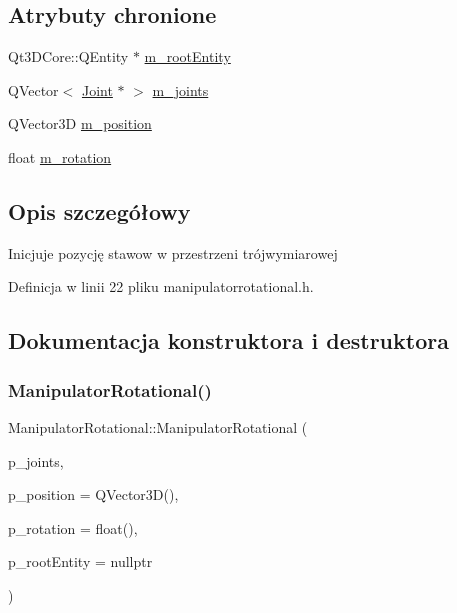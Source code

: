 \subsection*{Atrybuty chronione}
\begin{DoxyCompactItemize}
\item 
Qt3\+D\+Core\+::\+Q\+Entity $\ast$ \hyperlink{class_manipulator_rotational_a826543721395f9b5b7faa57caebe9a08}{m\+\_\+root\+Entity}
\item 
Q\+Vector$<$ \hyperlink{class_joint}{Joint} $\ast$ $>$ \hyperlink{class_manipulator_rotational_a31303c0a6c8a03f3cd0754aec802a808}{m\+\_\+joints}
\item 
Q\+Vector3D \hyperlink{class_manipulator_rotational_a18221f06199833851af9eebd9a6ca438}{m\+\_\+position}
\item 
float \hyperlink{class_manipulator_rotational_a6edaea6ee8740b4a517f49f65ddf229d}{m\+\_\+rotation}
\end{DoxyCompactItemize}


\subsection{Opis szczegółowy}
Inicjuje pozycję stawow w przestrzeni trójwymiarowej 

Definicja w linii 22 pliku manipulatorrotational.\+h.



\subsection{Dokumentacja konstruktora i destruktora}
\mbox{\label{class_manipulator_rotational_adb9a71718449baa93992784d56cf86d7}} 
\subsubsection{\texorpdfstring{Manipulator\+Rotational()}{ManipulatorRotational()}\hspace{0.1cm}{\footnotesize\ttfamily [1/2]}}
{\footnotesize\ttfamily Manipulator\+Rotational\+::\+Manipulator\+Rotational (\begin{DoxyParamCaption}\item[{Q\+Vector$<$ \hyperlink{class_joint}{Joint} $\ast$$>$}]{p\+\_\+joints,  }\item[{Q\+Vector3D}]{p\+\_\+position = {\ttfamily QVector3D()},  }\item[{float}]{p\+\_\+rotation = {\ttfamily float()},  }\item[{Qt3\+D\+Core\+::\+Q\+Entity $\ast$}]{p\+\_\+root\+Entity = {\ttfamily nullptr} }\end{DoxyParamCaption})}



